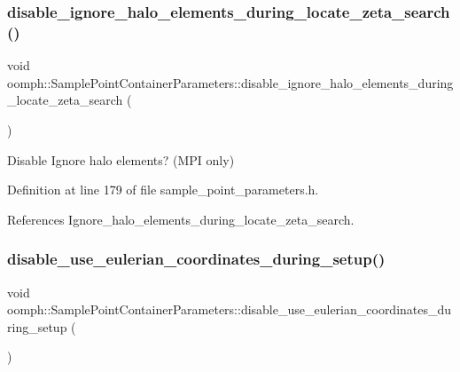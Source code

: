 \subsubsection{\texorpdfstring{disable\+\_\+ignore\+\_\+halo\+\_\+elements\+\_\+during\+\_\+locate\+\_\+zeta\+\_\+search()}{disable\_ignore\_halo\_elements\_during\_locate\_zeta\_search()}}
{\footnotesize\ttfamily void oomph\+::\+Sample\+Point\+Container\+Parameters\+::disable\+\_\+ignore\+\_\+halo\+\_\+elements\+\_\+during\+\_\+locate\+\_\+zeta\+\_\+search (\begin{DoxyParamCaption}{ }\end{DoxyParamCaption})\hspace{0.3cm}{\ttfamily [inline]}}



Disable Ignore halo elements? (M\+PI only) 



Definition at line 179 of file sample\+\_\+point\+\_\+parameters.\+h.



References Ignore\+\_\+halo\+\_\+elements\+\_\+during\+\_\+locate\+\_\+zeta\+\_\+search.

\mbox{\label{classoomph_1_1SamplePointContainerParameters_a9c59f44fa07b7f79e8b854d5b918e3bd}} 
\subsubsection{\texorpdfstring{disable\+\_\+use\+\_\+eulerian\+\_\+coordinates\+\_\+during\+\_\+setup()}{disable\_use\_eulerian\_coordinates\_during\_setup()}}
{\footnotesize\ttfamily void oomph\+::\+Sample\+Point\+Container\+Parameters\+::disable\+\_\+use\+\_\+eulerian\+\_\+coordinates\+\_\+during\+\_\+setup (\begin{DoxyParamCaption}{ }\end{DoxyParamCaption})\hspace{0.3cm}{\ttfamily [inline]}}

